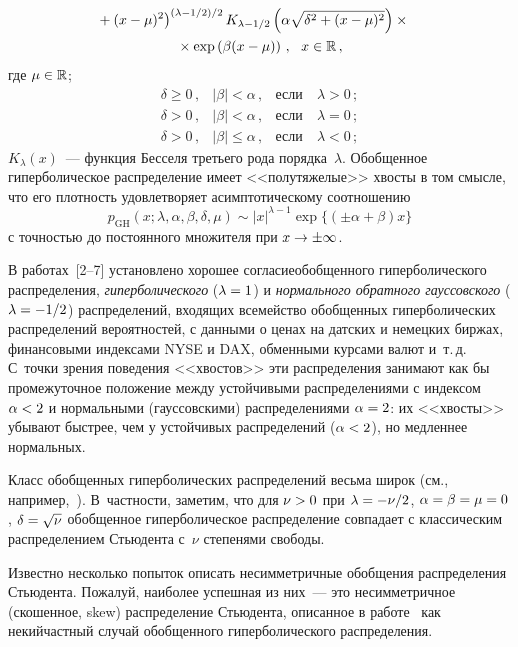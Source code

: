 \begin{multicols}{2}
 \noindent
 \begin{multline*}
\hspace*{-3.5mm}\left. {}+(x-\mu)^2\right)^{(\lambda-1/2)/2}
 K_{\lambda-{1}/{2}}\left(\alpha\sqrt{\delta^2+(x-\mu)^2}\right)
 \times{}\\
 {}\times \exp\left(\beta(x-\mu)\right)\,,\ \ x\in \mathbb{R}\,,
\end{multline*}
где $\mu\in\mathbb{R}$;
$$
\begin{array}{rccc}
  \delta \ge 0\,, & |\beta|<\alpha\,, & {\mbox{если}}\ &
\lambda>0\,;\\[6pt]
           \delta  > 0\,,  & |\beta|<\alpha\,, & {\mbox{если}}\ & \lambda=0\,;\\[6pt]
           \delta  > 0\,,  & |\beta|\le\alpha\,,&{\mbox{если}}\ &\lambda<0\,;
\end{array}
$$
$K_{\lambda}(x)$~--- функция Бесселя третьего рода порядка~$\lambda$. 
Обобщенное гиперболическое распределение имеет
<<полутяжелые>> хвосты в том смысле, что его плот\-ность
удовлетворяет асимптотическому соотношению
$$
p_{\mathrm{GH}}(x;\lambda,\alpha,\beta,\delta,\mu)\sim
|x|^{\lambda-1}\exp\{(\pm\alpha+\beta)x\}
$$ с точностью до
постоянного множителя при $x\hm\to\pm \infty$.

В работах~[2--7] установлено хорошее согласие\linebreak обобщенного
гиперболического распределения, \textit{гиперболического} ($\lambda\hm=1$)
и \textit{нормального обратного гауссовского} ($\lambda\hm=-1/2$)
распределений, входящих в\linebreak семейство обобщенных гиперболических
распределений вероятностей, с данными о ценах на датских и немецких
биржах, финансовыми индексами NYSE и DAX, обменными курсами валют и~т.\,д. 
С~точки зрения поведения <<хвостов>> эти распределения
занимают как бы промежуточное положение между устойчивыми
распределениями с индексом $\alpha\hm<2$ и нормальными (гауссовскими)
распределениями $\alpha\hm=2$: их <<хвосты>> убывают быстрее, чем у
устойчивых распределений ($\alpha\hm<2$), но медленнее нормальных.

Класс обобщенных гиперболических распределений весьма широк (см.,
например,~\cite{Korolev2011}). В~частности, заметим, что для
$\nu\hm>0$ при $\lambda\hm=-{\nu}/{2}$, $\alpha\hm=\beta\hm=\mu\hm=0$,
$\delta\hm=\sqrt{\nu}$ обобщенное гиперболическое распределение
совпадает с классическим распределением Стьюдента с~$\nu$
степенями свободы.

Известно несколько попыток описать несимметричные обобщения
распределения Стьюдента. Пожалуй, наиболее успешная из них~--- это
не\-симметричное (скошенное, skew) распределение Стьюдента,
описанное в работе~\cite{AasHaff2006} как некий\linebreak част\-ный 
 случай
обобщенного гиперболического распределения. 


\end{multicols}
